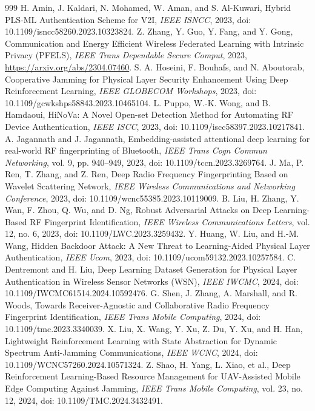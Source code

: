 \documentclass[10.5pt,compsoc,winfonts]{ICN}
\begin{document}
\begin{thebibliography}{999}
H. Amin, J. Kaldari, N. Mohamed, W. Aman, and S. Al-Kuwari, Hybrid PLS-ML Authentication Scheme for V2I, \emph{IEEE ISNCC}, 2023, doi: 10.1109/isncc58260.2023.10323824.
Z. Zhang, Y. Guo, Y. Fang, and Y. Gong, Communication and Energy Efficient Wireless Federated Learning with Intrinsic Privacy (PFELS), \emph{IEEE Trans Dependable Secure Comput}, 2023, \url{https://arxiv.org/abs/2304.07460}.
S. A. Hoseini, F. Bouhafs, and N. Aboutorab, Cooperative Jamming for Physical Layer Security Enhancement Using Deep Reinforcement Learning, \emph{IEEE GLOBECOM Workshops}, 2023, doi: 10.1109/gcwkshps58843.2023.10465104.
L. Puppo, W.-K. Wong, and B. Hamdaoui, HiNoVa: A Novel Open-set Detection Method for Automating RF Device Authentication, \emph{IEEE ISCC}, 2023, doi: 10.1109/iscc58397.2023.10217841.
A. Jagannath and J. Jagannath, Embedding-assisted attentional deep learning for real-world RF fingerprinting of Bluetooth, \emph{IEEE Trans Cogn Commun Networking}, vol. 9, pp. 940–949, 2023, doi: 10.1109/tccn.2023.3269764.
J. Ma, P. Ren, T. Zhang, and Z. Ren, Deep Radio Frequency Fingerprinting Based on Wavelet Scattering Network, \emph{IEEE Wireless Communications and Networking Conference}, 2023, doi: 10.1109/wcnc55385.2023.10119009.
B. Liu, H. Zhang, Y. Wan, F. Zhou, Q. Wu, and D. Ng, Robust Adversarial Attacks on Deep Learning-Based RF Fingerprint Identification, \emph{IEEE Wireless Communications Letters}, vol. 12, no. 6, 2023, doi: 10.1109/LWC.2023.3259432.
Y. Huang, W. Liu, and H.-M. Wang, Hidden Backdoor Attack: A New Threat to Learning-Aided Physical Layer Authentication, \emph{IEEE Ucom}, 2023, doi: 10.1109/ucom59132.2023.10257584.
C. Dentremont and H. Liu, Deep Learning Dataset Generation for Physical Layer Authentication in Wireless Sensor Networks (WSN), \emph{IEEE IWCMC}, 2024, doi: 10.1109/IWCMC61514.2024.10592476.
G. Shen, J. Zhang, A. Marshall, and R. Woods, Towards Receiver-Agnostic and Collaborative Radio Frequency Fingerprint Identification, \emph{IEEE Trans Mobile Computing}, 2024, doi: 10.1109/tmc.2023.3340039.
X. Liu, X. Wang, Y. Xu, Z. Du, Y. Xu, and H. Han, Lightweight Reinforcement Learning with State Abstraction for Dynamic Spectrum Anti-Jamming Communications, \emph{IEEE WCNC}, 2024, doi: 10.1109/WCNC57260.2024.10571324.
Z. Shao, H. Yang, L. Xiao, et al., Deep Reinforcement Learning-Based Resource Management for UAV-Assisted Mobile Edge Computing Against Jamming, \emph{IEEE Trans Mobile Computing}, vol. 23, no. 12, 2024, doi: 10.1109/TMC.2024.3432491.

\end{thebibliography}
\end{document}
